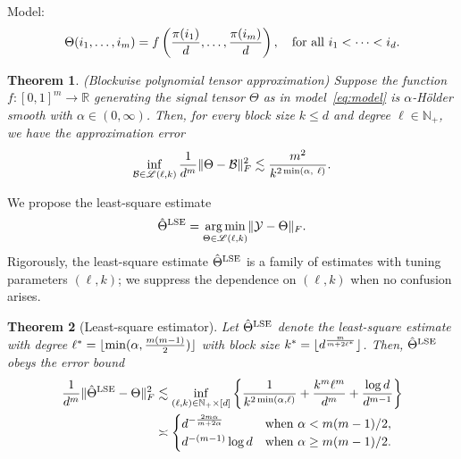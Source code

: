 \documentclass[final,12pt]{colt2020} %
\newtheorem{thm}{Theorem}[section]
\def\tL{\large\mathscr{L}}
\begin{document}
Model:
\begin{align}\label{eq:model}
\Theta(i_1,\ldots,i_m)=f\left({\pi(i_1)\over d}, \ldots,{\pi(i_m)\over d}\right),\quad \text{for all }i_1<\cdots<i_d.
\end{align}
\begin{thm}(Blockwise polynomial tensor approximation) Suppose the function $f\colon[0,1]^m\to \mathbb{R}$ generating the signal tensor $\Theta$ as in model~\eqref{eq:model} is $\alpha$-H\"older smooth with $\alpha\in(0,\infty)$. Then, for every block size $k\leq d$ and degree $\ell\in\mathbb{N}_{+}$, we have the approximation error
\[
\inf_{\tB\in \tL(\ell,k)}{1\over d^m}\FnormSize{}{\Theta-\tB}^2 \lesssim {m^2\over k^{2\min(\alpha,\ \ell)}}.
\]
\end{thm}

We propose the least-square estimate
\[
\hat \Theta^\textup{LSE}=\argmin_{\Theta\in \tL(\ell,k)}\FnormSize{}{\tY-\Theta}.
\]
Rigorously, the least-square estimate $\hat \Theta^\textup{LSE}$ is a family of estimates with tuning parameters $(\ell,k)$; we suppress the dependence on $(\ell,k)$ when no confusion arises. 

\begin{thm}[Least-square estimator] Let $\hat \Theta^\textup{LSE}$ denote the least-square estimate with degree $\ell^*=\lfloor \min(\alpha, {m(m-1)\over 2})\rfloor$ with block size $k^*=\lfloor d^{m\over m+2\ell^*} \rfloor$. Then, $\hat \Theta^\textup{LSE}$ obeys the error bound
\begin{equation}
\begin{aligned}
{1\over d^m}\lVert\hat \Theta^\textup{LSE}-\Theta\rVert_F^2&\lesssim 
\inf_{(\ell,k)\in\mathbb{N}_{+}\times[d]}\left\{{1\over k^{2\min(\alpha,\ell)}}+{k^m\ell^m \over d^{m}}+{\log d\over d^{m-1}}\right\}\notag \\
&\asymp
\begin{cases}
d^{-{2m\alpha \over m+2\alpha}} & \text{when }\alpha<m(m-1)/2,\\
 d^{-(m-1)}\log d & \text{when }\alpha\geq m(m-1)/2.\\
\end{cases}
\end{aligned}
\end{equation}
\end{thm}
\end{document}
